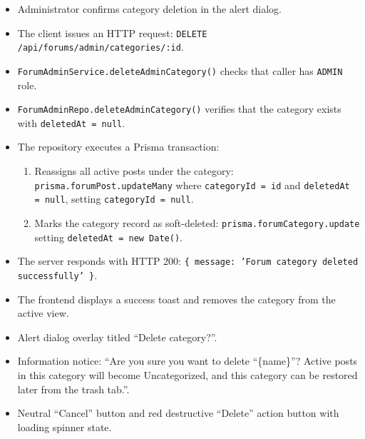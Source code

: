 \begin{itemize}[leftmargin=1.6em,topsep=3pt,itemsep=2pt,parsep=0pt,label=$\bullet$]
    \item Administrator confirms category deletion in the alert dialog.
    \item The client issues an HTTP request: \texttt{DELETE /api/forums/admin/categories/:id}.
    \item \texttt{ForumAdminService.deleteAdminCategory()} checks that caller has \texttt{ADMIN} role.
    \item \texttt{ForumAdminRepo.deleteAdminCategory()} verifies that the category exists with \texttt{deletedAt = null}.
    \item The repository executes a Prisma transaction:
        \begin{enumerate}[leftmargin=1.6em,topsep=2pt,itemsep=2pt,parsep=0pt]
            \item Reassigns all active posts under the category: \texttt{prisma.forumPost.updateMany} where \texttt{categoryId = id} and \texttt{deletedAt = null}, setting \texttt{categoryId = null}.
            \item Marks the category record as soft-deleted: \texttt{prisma.forumCategory.update} setting \texttt{deletedAt = new Date()}.
        \end{enumerate}
    \item The server responds with HTTP 200: \texttt{\{ message: 'Forum category deleted successfully' \}}.
    \item The frontend displays a success toast and removes the category from the active view.
\end{itemize}

\begin{itemize}[leftmargin=1.6em,topsep=3pt,itemsep=2pt,parsep=0pt,label=$\bullet$]
    \item Alert dialog overlay titled ``Delete category?''.
    \item Information notice: ``Are you sure you want to delete ``\{name\}''? Active posts in this category will become Uncategorized, and this category can be restored later from the trash tab.''.
    \item Neutral ``Cancel'' button and red destructive ``Delete'' action button with loading spinner state.
\end{itemize}


